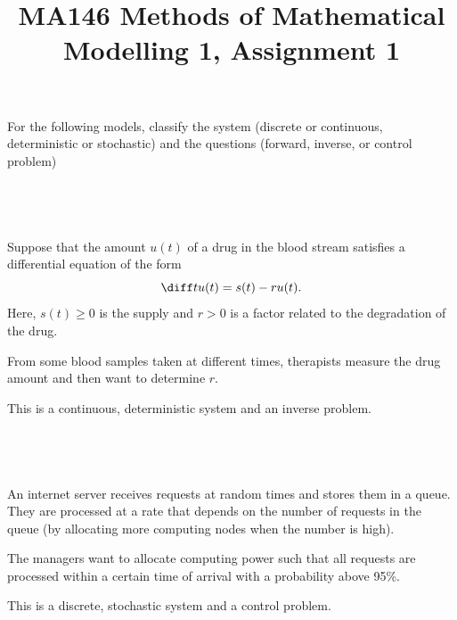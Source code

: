 \documentclass[a4paper]{article}
\title{MA146 Methods of Mathematical Modelling 1, Assignment 1}
\begin{document}
\maketitle

\setlength{\parindent}{0em}
\setlength{\parskip}{1em}


\begin{questionbody}
For the following models, classify the system (discrete or continuous, deterministic or
stochastic) and the questions (forward, inverse, or control problem)
\end{questionbody}

\subsection{~} %

\begin{questionbody}
Suppose that the amount $u(t)$ of a drug in the blood stream satisfies a differential equation of the form \[
\diff t u(t) = s(t) - r u(t).
\]
Here, $s(t) \ge 0$ is the supply and $r > 0$ is a factor related to the degradation of the drug.

From some blood samples taken at different times, therapists measure the drug amount and then want to determine $r$.
\end{questionbody}

This is a continuous, deterministic system and an inverse problem.

\subsection{~} %

\begin{questionbody}
An internet server receives requests at random times and stores them in a queue. They are processed at a rate that depends on the number of requests in the queue (by allocating more computing nodes when the number is high).

The managers want to allocate computing power such that all requests are processed within a certain time of arrival with a probability above 95\%.
\end{questionbody}

This is a discrete, stochastic system and a control problem.

\newpage
\subsection{~} %
\end{document}
